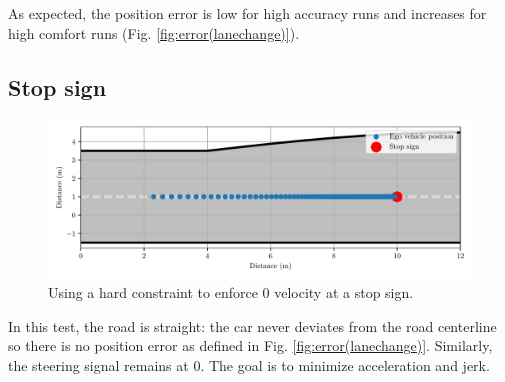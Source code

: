 \documentclass[letterpaper, 10 pt, conference]{ieeeconf}  %
\begin{document}
 As expected, the position error is low for high accuracy runs and increases for high comfort runs (Fig. \ref{fig:error(lanechange)}).
 
 \subsection{Stop sign}
 
 
\begin{figure}[h!]
	\centering
	\includegraphics[width=1.0\linewidth]{figures/stop_sign.pdf}
	 	\vspace{-1.5em}
	\caption{Using a hard constraint to enforce 0 velocity at a stop sign.}
		\label{fig:stop_sign}
\end{figure}
 
% 
 In this test, the road is straight: the car never deviates from the road centerline so there is no position error as defined in Fig. \ref{fig:error(lanechange)}. Similarly, the steering signal remains at 0. The goal is to minimize acceleration and jerk.
 
\end{document}
